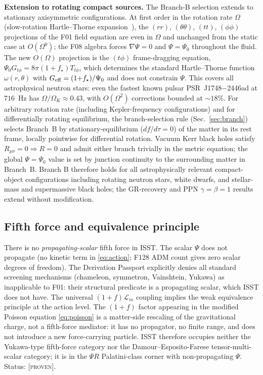 \documentclass[aps,prd,twocolumn,nofootinbib,floatfix,superscriptaddress]{revtex4-2}
\newcommand{\PROVEN}{{\color{black!75!green}\textsc{[proven]}}}
\newcommand{\Lm}{\mathcal{L}_m}
\begin{document}
\textbf{Extension to rotating compact sources.}
The Branch-B selection extends to stationary axisymmetric
configurations. At first order in the rotation rate $\Omega$
(slow-rotation Hartle--Thorne expansion~\cite{Hartle1967}), the
$(rr)$, $(\theta\theta)$, $(tt)$, $(\phi\phi)$ projections of the F01
field equation are even in $\Omega$ and unchanged from the static
case at $O(\Omega^0)$; the F08 algebra forces $\nabla\Psi = 0$ and
$\Psi = \Psi_0$ throughout the fluid. The new $O(\Omega)$ projection
is the $(t\phi)$ frame-dragging equation,
$\Psi_0 G_{t\phi} = 8\pi(1{+}f_\star)T_{t\phi}$, which determines
the standard Hartle--Thorne function $\omega(r,\theta)$ with
$G_{\rm eff} = (1{+}f_\star)/\Psi_0$ and does not constrain $\Psi$.
This covers all astrophysical neutron stars: even the fastest known
pulsar PSR~J1748$-$2446ad at $716$~Hz has
$\Omega/\Omega_K \approx 0.43$, with $O(\Omega^2)$ corrections
bounded at $\sim 18\%$. For arbitrary rotation rate (including
Kepler-frequency configurations) and for differentially rotating
equilibrium, the branch-selection rule (Sec.~\ref{sec:branch})
selects Branch~B by stationary-equilibrium ($df/d\tau = 0$) of the
matter in its rest frame, locally pointwise for differential
rotation. Vacuum Kerr black holes satisfy
$R_{\mu\nu} = 0 \Rightarrow R = 0$ and admit either branch trivially
in the metric equation; the global $\Psi = \Psi_0$ value is set by
junction continuity to the surrounding matter in Branch~B. Branch B
therefore holds for all astrophysically relevant compact-object
configurations including rotating neutron stars, white dwarfs, and
stellar-mass and supermassive black holes; the GR-recovery and PPN
$\gamma = \beta = 1$ results extend without modification.

\subsection{Fifth force and equivalence principle}
\label{sec:fifth}

There is no \emph{propagating-scalar} fifth force in ISST. The scalar
$\Psi$ does not propagate (no kinetic term in \eqref{eq:action}; F128
ADM count gives zero scalar degrees of freedom). The Derivation
Passport explicitly denies all standard screening mechanisms
(chameleon, symmetron, Vainshtein, Yukawa) as inapplicable to F01:
their structural predicate is a propagating scalar, which ISST does
not have. The universal $(1+f)\Lm$ coupling implies the weak
equivalence principle at the action level. The $(1+f)$ factor
appearing in the modified Poisson equation \eqref{eq:poisson} is a
matter-side rescaling of the gravitational charge, not a fifth-force
mediator: it has no propagator, no finite range, and does not
introduce a new force-carrying particle. ISST therefore occupies
neither the Yukawa-type fifth-force category nor the
Damour--Esposito-Farese tensor-multi-scalar category; it is in the
$\Psi R$ Palatini-class corner with non-propagating $\Psi$.
Status: \PROVEN.
\end{document}
